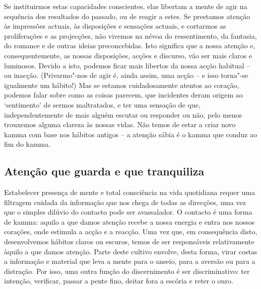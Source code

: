 Se instituirmos estas capacidades conscientes, elas libertam a mente de agir na
sequência dos resultados do passado, ou de reagir a estes. Se prestamos atenção
às impressões actuais, às disposições e sensações actuais, e cortarmos as
proliferações e as projecções, não vivemos na névoa do ressentimento, da
fantasia, do romance e de outras ideias preconcebidas. Isto significa que a
nossa atenção e, consequentemente, as nossas disposições, acções e discurso, vão
ser mais claros e luminosos. Devido a isto, podemos ficar mais libertos da nossa
acção habitual -- ou inacção. (Privarmo"-nos de agir é, ainda assim, uma acção --
e isso torna"-se igualmente um hábito!) Mas se estamos cuidadosamente atentos ao
coração, podemos falar sobre como as coisas parecem, que incidentes deram origem
ao `sentimento' de sermos maltratados, e ter uma sensação de que,
independentemente de mais alguém escutar ou responder ou não, pelo menos
trouxemos alguma clareza às nossas vidas. Não temos de estar a criar novo kamma
com base nos hábitos antigos -- a atenção sábia é o kamma que conduz ao fim do
kamma.

\subsection{Atenção que guarda e que tranquiliza}

Estabelecer presença de mente e total consciência na vida quotidiana requer uma
filtragem cuidada da informação que nos chega de todas as direcções, uma vez que
o simples dilúvio do contacto pode ser avassalador. O contacto é uma forma de
kamma: aquilo a que damos atenção recebe a nossa energia e entra nos nossos
corações, onde estimula a acção e a reacção.
Uma vez que, em consequência disto, desenvolvemos hábitos claros ou escuros,
temos de ser responsáveis relativamente àquilo a que damos atenção. Parte deste
cultivo envolve, desta forma, virar costas a informação e material que leva a
mente para o anseio, para a aversão ou para a distração. Por isso, uma outra
função do discernimento é ser discriminativo: ter intenção, verificar, passar a
pente fino, deitar fora a escória e reter o ouro.

